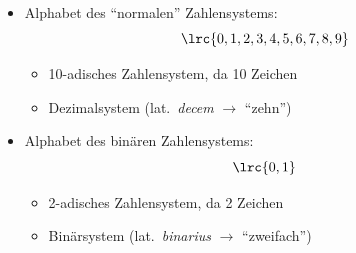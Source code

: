 \begin{frame}
\begin{itemize}[<+->]\setlength\itemsep{8pt}
    \item Alphabet des \enquote{normalen} Zahlensystems:
    $$\lrc{0,1,2,3,4,5,6,7,8,9}$$
    \begin{itemize}
    \item \textcolor{FDUblue}{10-adisches} Zahlensystem, da 10 Zeichen
    \item \textcolor{FDUteal}{Dezimalsystem} (lat.\ \textit{decem} $\rightarrow$ \enquote{zehn})
    \end{itemize}
    \item Alphabet des binären Zahlensystems:
    $$\lrc{0,1}$$
    \begin{itemize}
    \item \textcolor{FDUblue}{2-adisches} Zahlensystem, da 2 Zeichen
    \item \textcolor{FDUteal}{Binärsystem} (lat.\ \textit{binarius} $\rightarrow$ \enquote{zweifach})
    \end{itemize}
\end{itemize}
\end{frame}

\begin{frame}
\end{frame}

